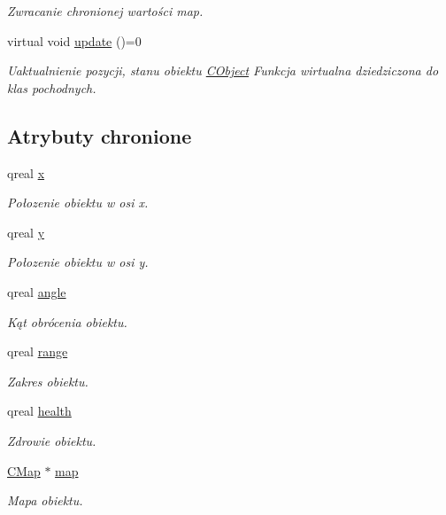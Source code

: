 \begin{DoxyCompactItemize}
\begin{DoxyCompactList}\small\item\em Zwracanie chronionej wartości map. \end{DoxyCompactList}\item 
virtual void \mbox{\hyperlink{class_c_object_acb42ca516e836d0267ddb9a0556916a9}{update}} ()=0
\begin{DoxyCompactList}\small\item\em Uaktualnienie pozycji, stanu obiektu \mbox{\hyperlink{class_c_object}{C\+Object}} Funkcja wirtualna dziedziczona do klas pochodnych. \end{DoxyCompactList}\end{DoxyCompactItemize}
\subsection*{Atrybuty chronione}
\begin{DoxyCompactItemize}
\item 
qreal \mbox{\hyperlink{class_c_object_acb23178c7b65e6cf37f9ab95128cd8d2}{x}}
\begin{DoxyCompactList}\small\item\em Połozenie obiektu w osi x. \end{DoxyCompactList}\item 
qreal \mbox{\hyperlink{class_c_object_a22fd03bdf2bc5c7058e4c2a9c9237c64}{y}}
\begin{DoxyCompactList}\small\item\em Połozenie obiektu w osi y. \end{DoxyCompactList}\item 
qreal \mbox{\hyperlink{class_c_object_a9ac381be23878447d48800b16d773efa}{angle}}
\begin{DoxyCompactList}\small\item\em Kąt obrócenia obiektu. \end{DoxyCompactList}\item 
qreal \mbox{\hyperlink{class_c_object_a0d3f8546df4d7620602646e7661d905e}{range}}
\begin{DoxyCompactList}\small\item\em Zakres obiektu. \end{DoxyCompactList}\item 
qreal \mbox{\hyperlink{class_c_object_acfa8d5b33a7b561978899ba1b0d78361}{health}}
\begin{DoxyCompactList}\small\item\em Zdrowie obiektu. \end{DoxyCompactList}\item 
\mbox{\hyperlink{class_c_map}{C\+Map}} $\ast$ \mbox{\hyperlink{class_c_object_a958cfe5f141fdab246af5da849f98d07}{map}}
\begin{DoxyCompactList}\small\item\em Mapa obiektu. \end{DoxyCompactList}\end{DoxyCompactItemize}


